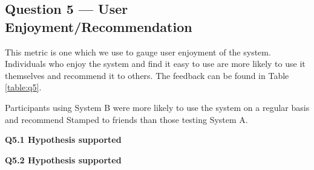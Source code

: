 \subsection{Question 5 --- User Enjoyment/Recommendation}
This metric is one which we use to gauge user enjoyment of the system. Individuals who enjoy the system and find it easy to use are more likely to use it themselves and recommend it to others. The feedback can be found in Table \ref{table:q5}.
    \begin{table}[H]
    \caption{Table showing answers to question 5 from the study}
    \label{table:q5}
    \end{table}
    \newpage
   	Participants using System B were more likely to use the system on a regular basis and recommend Stamped to friends than those testing System A. 
   	
	\textbf{Q5.1 Hypothesis supported}

	\textbf{Q5.2 Hypothesis supported }   
    
